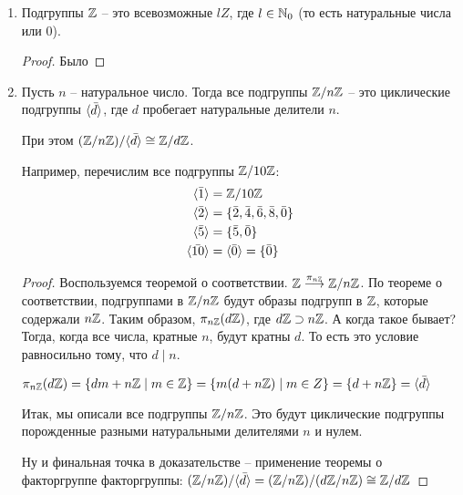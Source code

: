 \follow \begin{enumerate}
    \item Подгруппы $\mathbb{Z}$ -- это всевозможные $lZ$, где $l \in \mathbb{N}_0$ (то есть натуральные числа или 0). 
    \begin{proof}
        Было
    \end{proof}
    \item Пусть $n$ -- натуральное число. Тогда все подгруппы $\mathbb{Z} / n\mathbb{Z}$ -- это циклические подгруппы $\langle \bar d \rangle$, 
    где $d$ пробегает натуральные делители $n$. 
    
    При этом $(\mathbb{Z}/ n\mathbb{Z})/ \langle \bar d \rangle \cong \mathbb{Z}/d\mathbb{Z}$. 
    
    Например, перечислим все подгруппы $\mathbb{Z}/10\mathbb{Z}$: 
    \begin{align*}
        \langle \bar 1 \rangle &= \mathbb{Z}/ 10 \mathbb{Z} \\
        \langle \bar 2 \rangle &= \{\bar 2, \bar 4, \bar 6, \bar 8, \bar 0\} \\
        \langle \bar 5 \rangle &= \{\bar 5, \bar 0\} \\
        \langle \bar{10} \rangle &= \langle \bar 0 \rangle = \{\bar 0\} \\
    \end{align*}
    \begin{proof}
        Воспользуемся теоремой о соответствии. $\mathbb{Z}  \overset{\pi_{n\mathbb{Z}}}{\longrightarrow} \mathbb{Z}/ n\mathbb{Z}$. По теореме о соответствии, 
        подгруппами в $\mathbb{Z}/ n\mathbb{Z}$ будут образы подгрупп в $\mathbb{Z}$, которые содержали $n\mathbb{Z}$. Таким образом, $\pi_{n\mathbb{Z}}(d\mathbb{Z})$, где 
        $d\mathbb{Z} \supset n\mathbb{Z}$. А когда такое бывает? Тогда, когда все числа, кратные $n$, будут кратны $d$. То есть это условие 
        равносильно тому, что $d \mid n$.

        $\pi_{n\mathbb{Z}}(d\mathbb{Z}) = \{dm + n\mathbb{Z}\mid m \in \mathbb{Z}\} = \{m (d + n\mathbb{Z})\mid m \in Z\} = \{d + n\mathbb{Z}\} = \langle \bar d \rangle$

        Итак, мы описали все подгруппы $\mathbb{Z}/ n\mathbb{Z}$. Это будут циклические подгруппы порожденные разными натуральными 
        делителями $n$ и нулем. 

        Ну и финальная точка в доказательстве -- применение теоремы о факторгруппе факторгруппы: $(\mathbb{Z}/n\mathbb{Z})/\langle \bar d \rangle = (\mathbb{Z}/n\mathbb{Z})/(d\mathbb{Z}/ n\mathbb{Z}) \cong \mathbb{Z}/d\mathbb{Z}$
    \end{proof}
\end{enumerate}

